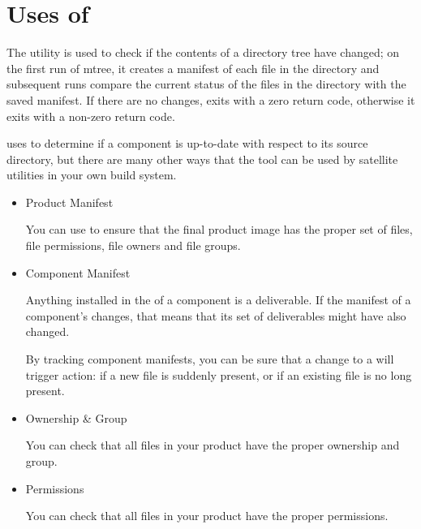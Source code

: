 %
%
%
%
\chapter{Uses of \mtree}\label{chap:mtree}

The \mtree utility is used to check if the contents of a directory
tree have changed; on the first run of mtree, it creates a manifest of
each file in the directory and subsequent runs compare the current
status of the files in the directory with the saved manifest.  If
there are no changes, \mtree exits with a zero return code, otherwise
it exits with a non-zero return code.

\lmsbw uses \mtree to determine if a component is up-to-date with
respect to its source directory, but there are many other ways that
the tool can be used by satellite utilities in your own build system.

\begin{itemize}
\item Product Manifest

  You can use \mtree to ensure that the final product image has the
  proper set of files, file permissions, file owners and file groups.

\item Component Manifest

  Anything installed in the \destdir of a component is a deliverable.
  If the manifest of a component's \destdir changes, that means that
  its set of deliverables might have also changed.

  By tracking component \destdir manifests, you can be sure that a
  change to a \destdir will trigger action: if a new file is
  suddenly present, or if an existing file is no long present.

\item Ownership \& Group

  You can check that all files in your product have the proper
  ownership and group.

\item Permissions

  You can check that all files in your product have the proper
  permissions.

\end{itemize}
